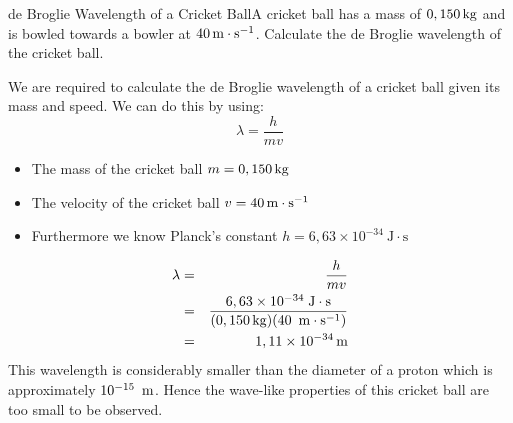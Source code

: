 \begin{wex}{de Broglie Wavelength of a Cricket Ball}{A cricket ball has a mass of $0,150\,\mathrm{kg}$ and is bowled towards a bowler at $40\,\mathrm{m \cdot s^{-1}}$. Calculate the de Broglie wavelength of the cricket ball.}
{
We are required to calculate the de Broglie wavelength of a cricket ball given its mass and speed. We can do this by using:
$$\lambda=\frac{h}{mv}$$

\begin{minipage}{.8\textwidth}
\begin{itemize}
\item The mass of the cricket ball $m=0,150\,\mathrm{kg}$
\item The velocity of the cricket ball $v=40\,\mathrm{m \cdot s^{-1}}$
\item Furthermore we know Planck's constant $h=6,63\times 10^{-34}~\mathrm{J\cdot s}$
\end{itemize}
\end{minipage}
\begin{eqnarray*}
\lambda&=&\frac{h}{mv}\\
&=&\frac{6,63 \times 10^{-34}\;\mathrm{J\cdot s}}{(0,150\,\mathrm{kg})(40~\,\mathrm{m \cdot s^{-1}})}\\
&=& 1,11 \times 10^{-34}\,\rm{m}
\end{eqnarray*}
This wavelength is considerably smaller than the diameter of a proton which is approximately $10^{-15}~\,\rm{m}$. Hence the wave-like properties of this cricket ball are too small to be  observed.
}
\end{wex}

